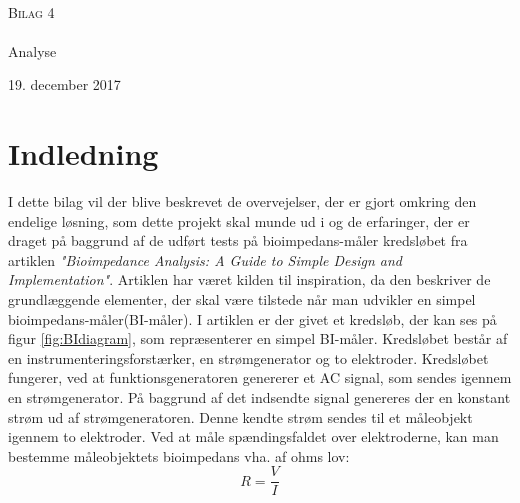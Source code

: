 



\begin{titlingpage}
\begin{center}

~ \\[3cm]


\textsc{\LARGE Bilag 4}\\[1.5cm]


\noindent\makebox[\linewidth]{\rule{\textwidth}{0.4pt}}\\
[0.5cm]{\Huge Analyse}
\noindent\makebox[\linewidth]{\rule{\textwidth}{0.4pt}}
\end{center}
\vfill
\begin{center}
{\large 19. december 2017}
\end{center}
\end{titlingpage}



\newpage
\tableofcontents*
\newpage


\chapter{Indledning}

I dette bilag vil der blive beskrevet de overvejelser, der er gjort omkring den endelige løsning, som dette projekt skal munde ud i og de erfaringer, der er draget på baggrund af de udført tests på bioimpedans-måler kredsløbet fra artiklen \textit{"Bioimpedance Analysis: A Guide to Simple Design and Implementation"}. Artiklen har været kilden til inspiration, da den beskriver de grundlæggende elementer, der skal være tilstede når man udvikler en simpel bioimpedans-måler(BI-måler). I artiklen er der givet et kredsløb, der kan ses på figur \ref{fig:BIdiagram}, som repræsenterer en simpel BI-måler. Kredsløbet består af en instrumenteringsforstærker, en strømgenerator og to elektroder. Kredsløbet fungerer, ved at funktionsgeneratoren genererer et AC signal, som sendes igennem en strømgenerator. På baggrund af det indsendte signal genereres der en konstant strøm ud af strømgeneratoren. Denne kendte strøm sendes til et måleobjekt igennem to elektroder. Ved at måle spændingsfaldet over elektroderne, kan man bestemme måleobjektets bioimpedans vha. af ohms lov: $$R=\frac{V}{I}$$

